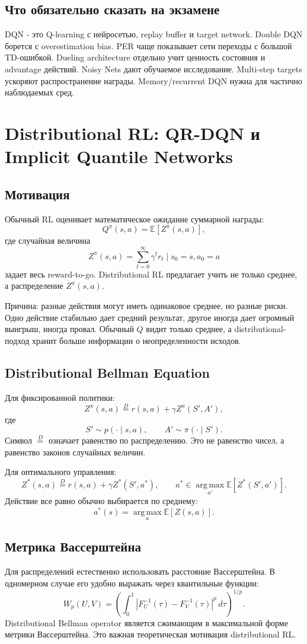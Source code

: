 \documentclass[11pt,a4paper]{article}
\newcommand{\E}{\mathbb{E}}
\newcommand{\argmax}{\operatorname*{arg\,max}}
\newcommand{\1}{\mathbf{1}}
\newcommand{\dd}{\,d}
\begin{document}
\subsection*{Что обязательно сказать на экзамене}
DQN - это Q-learning с нейросетью, replay buffer и target network. Double DQN борется с overestimation bias. PER чаще показывает сети переходы с большой TD-ошибкой. Dueling architecture отдельно учит ценность состояния и advantage действий. Noisy Nets дают обучаемое исследование. Multi-step targets ускоряют распространение награды. Memory/recurrent DQN нужна для частично наблюдаемых сред.

\newpage
\section{Distributional RL: QR-DQN и Implicit Quantile Networks}

\subsection*{Мотивация}
Обычный RL оценивает математическое ожидание суммарной награды:
\[
    Q^\pi(s,a)=\E[Z^\pi(s,a)],
\]
где случайная величина
\[
    Z^\pi(s,a)=\sum_{t=0}^\infty\gamma^t r_t\mid s_0=s,a_0=a
\]
задает весь reward-to-go. Distributional RL предлагает учить не только среднее, а распределение $Z^\pi(s,a)$.

Причина: разные действия могут иметь одинаковое среднее, но разные риски. Одно действие стабильно дает средний результат, другое иногда дает огромный выигрыш, иногда провал. Обычный $Q$ видит только среднее, а distributional-подход хранит больше информации о неопределенности исходов.

\subsection*{Distributional Bellman Equation}
Для фиксированной политики:
\[
    Z^\pi(s,a) \overset{D}{=} r(s,a)+\gamma Z^\pi(S',A'),
\]
где
\[
    S'\sim p(\cdot\mid s,a),
    \qquad
    A'\sim \pi(\cdot\mid S').
\]
Символ $\overset{D}{=}$ означает равенство по распределению. Это не равенство чисел, а равенство законов случайных величин.

Для оптимального управления:
\[
    Z^*(s,a) \overset{D}{=} r(s,a)+\gamma Z^*(S',a^*),
    \qquad
    a^*\in\argmax_{a'}\E[Z^*(S',a')].
\]
Действие все равно обычно выбирается по среднему:
\[
    a^*(s)=\argmax_a \E[Z(s,a)].
\]

\subsection*{Метрика Вассерштейна}
Для распределений естественно использовать расстояние Вассерштейна. В одномерном случае его удобно выражать через квантильные функции:
\[
    W_p(U,V)=\left(\int_0^1 |F_U^{-1}(\tau)-F_V^{-1}(\tau)|^p\dd\tau\right)^{1/p}.
\]
Distributional Bellman operator является сжимающим в максимальной форме метрики Вассерштейна. Это важная теоретическая мотивация distributional RL.
\end{document}
